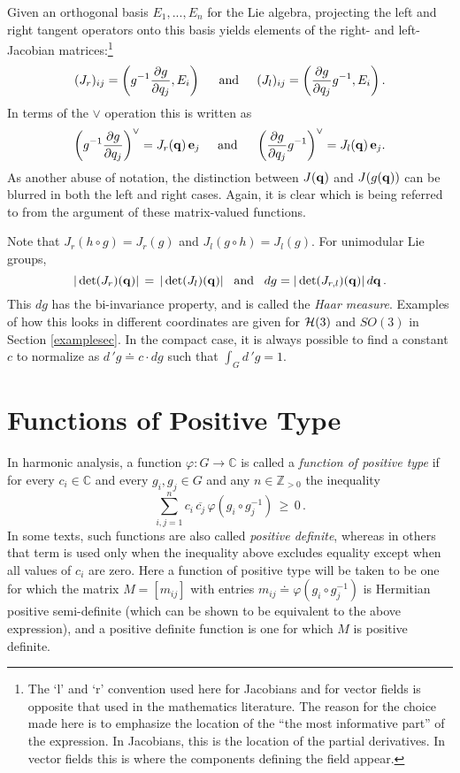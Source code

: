 \documentclass{svmult}
\def\htab{ {\hskip 0.1 true in} }
\newcommand{\IZ}{\mathbb{Z}}
\newcommand{\IC}{\mathbb{C}}
\newcommand{\qq}{{\bf q}}
\newcommand{\askip}{\htab\htab {\rm and} \htab\htab}
\begin{document}
Given an orthogonal basis $E_1, ..., E_n$
for the Lie algebra, projecting the left and
right tangent operators onto this basis yields
elements of the right- and left-Jacobian matrices:\footnote{The `l' and `r' convention
used here for Jacobians and for vector fields is opposite that used in the mathematics literature.
The reason for the choice made here is to emphasize the location of the ``the most informative part'' of the
expression. In Jacobians, this is the location of the partial derivatives. In vector fields this is where
the components defining the field appear.}
\begin{equation}
(J_r)_{ij} = \left(g^{-1} \frac{\partial g}{\partial q_j},
E_i\right)
\hskip 0.2 true in {\rm and} \hskip 0.2 true in
(J_l)_{ij} = \left(\frac{\partial g}{\partial q_j} g^{-1},
E_i\right).
\label{jacdefs}
\end{equation}
In terms of the $\vee$ operation this is written as
$$ \left(g^{-1} \frac{\partial g}{\partial q_j} \right)^{\vee} = J_r(\qq) \, {\bf e}_j
\askip \left(\frac{\partial g}{\partial q_j} g^{-1}\right)^{\vee} = J_l(\qq) \, {\bf e}_j . $$
As another abuse of notation, the distinction between $J(\qq)$ and $J(g(\qq))$ can be blurred
in both the left and right cases. Again, it is clear which is being referred to from the argument
of these matrix-valued functions.

Note that $J_r(h \circ g) = J_r(g)$
and $J_l(g \circ h) = J_l(g)$.
For unimodular Lie groups,
\begin{equation}
|\det (J_r)(\qq)| \,=\, |\det (J_l)(\qq)| \,\,\,\,\,{\rm and}\,\,\,\,\, dg = |\det (J_{r,l})(\qq)|\,d\qq\,.
\label{detcond2322}
\end{equation}
This $dg$ has the bi-invariance property, and is called the {\it Haar measure}. Examples of how this looks in different coordinates are given for ${\cal H}(3)$ and $SO(3)$ in Section \ref{examplesec}. In the compact case,
it is always possible to find a constant $c$ to normalize as $d\,'g \doteq c \cdot dg$ such that $\int_{G} d\,'g = 1$.

\section{Functions of Positive Type} \label{postypesec}

In harmonic analysis, a function $\varphi:G \rightarrow \IC$ is called
a {\it function of positive type} if for every
$c_i \in \IC$ and every $g_i, g_j \in G$ and any $n \in \IZ_{>0}$ the inequality
$$ \sum_{i,j=1}^{n} c_i\, \overline{c_j}\, \varphi(g_{i}^{} \circ g_{j}^{-1}) \,\geq\,0\,. $$
In some texts, such functions are also called {\it positive definite}, whereas
in others that term is used only when the inequality above excludes equality
except when all values of $c_i$ are zero. Here a function of
positive type will be taken to be one for which the matrix $M = [m_{ij}]$ with entries  $m_{ij} \doteq \varphi(g_{i}^{} \circ g_{j}^{-1})$ is Hermitian positive semi-definite (which can be shown to be equivalent to the above expression), and a positive  definite function is one for which $M$ is positive definite.
\end{document}
